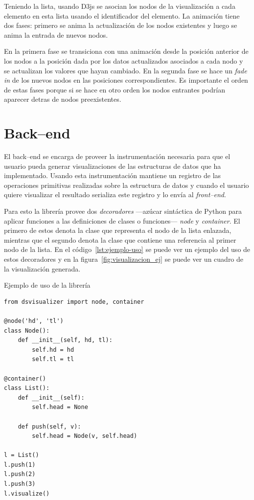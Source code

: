 Teniendo la lista, usando D3js se asocian los nodos de la visualización a cada elemento en esta lista usando el identificador del elemento. La animación tiene dos fases: primero se anima la actualización de los nodos existentes y luego se anima la entrada de nuevos nodos.

En la primera fase se transiciona con una animación desde la posición anterior de los nodos a la posición dada por los datos actualizados asociados a cada nodo y se actualizan los valores que hayan cambiado. En la segunda fase se hace un \textit{fade in} de los nuevos nodos en las posiciones correspondientes. Es importante el orden de estas fases porque si se hace en otro orden los nodos entrantes podrían aparecer detras de nodos preexistentes.

\section{Back--end}

El back--end se encarga de proveer la instrumentación necesaria para que el usuario pueda generar visualizaciones de las estructuras de datos que ha implementado. Usando esta instrumentación mantiene un registro de las operaciones primitivas realizadas sobre la estructura de datos y cuando el usuario quiere visualizar el resultado serializa este registro y lo envía al \textit{front--end}.

Para esto la librería provee dos \textit{decoradores} ---azúcar sintáctica de Python para aplicar funciones a las definiciones de clases o funciones--- \textit{node} y \textit{container}. El primero de estos denota la clase que representa el nodo de la lista enlazada, mientras que el segundo denota la clase que contiene una referencia al primer nodo de la lista. En el código~\ref{lst:ejemplo-uso} se puede ver un ejemplo del uso de estos decoradores y en la figura~\ref{fig:visualizacion_ej} se puede ver un cuadro de la visualización generada.

\begin{listing}[htb]
\caption{Ejemplo de uso de la librería}
\label{lst:ejemplo-uso}
\begin{verbatim}
from dsvisualizer import node, container

@node('hd', 'tl')
class Node():
    def __init__(self, hd, tl):
        self.hd = hd
        self.tl = tl

@container()
class List():
    def __init__(self):
        self.head = None

    def push(self, v):
        self.head = Node(v, self.head)

l = List()
l.push(1)
l.push(2)
l.push(3)
l.visualize()
\end{verbatim}
\end{listing}

